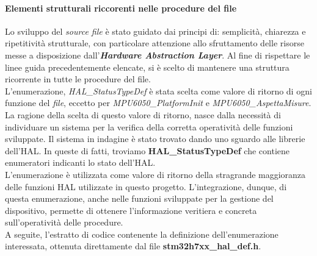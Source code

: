 \documentclass[11pt]{report}
\begin{document}
\paragraph{Elementi strutturali riccorenti nelle procedure del file}
Lo sviluppo del \textit{source file} è stato guidato dai principi di: semplicità, chiarezza e ripetitività strutturale, con particolare attenzione allo sfruttamento delle risorse messe a disposizione dall'\textbf{\textit{Hardware Abstraction Layer}}.
Al fine di rispettare le linee guida precedentemente elencate, si è scelto di mantenere una struttura ricorrente in tutte le procedure del file.\\
L'enumerazione, \textit{HAL\_StatusTypeDef} è stata scelta come valore di ritorno di ogni funzione del \textit{file}, eccetto per \textit{MPU6050\_PlatformInit} e \textit{MPU6050\_AspettaMisure}.
La ragione della scelta di questo valore di ritorno, nasce dalla necessità di individuare un sistema per la verifica della corretta operatività delle funzioni sviluppate. Il sistema in indagine è stato trovato dando uno sguardo alle librerie dell'HAL.
In queste di fatti, troviamo \textbf{HAL\_StatusTypeDef} che contiene enumeratori indicanti lo stato dell'HAL.\\
L'enumerazione è utilizzata come valore di ritorno della stragrande maggioranza delle funzioni HAL utilizzate in questo progetto. L'integrazione, dunque, di questa enumerazione, anche nelle funzioni sviluppate per la gestione del dispositivo, permette di ottenere 
l'informazione veritiera e concreta sull'operatività delle procedure.\\
A seguite, l'estratto di codice contenente la definizione dell'enumerazione interessata, ottenuta direttamente dal file \textbf{stm32h7xx\_hal\_def.h}.

\newpage

\end{document}
